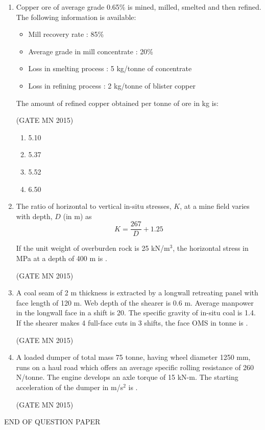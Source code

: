\documentclass[journal]{IEEEtran}
\begin{document}
\begin{enumerate}
\item Copper ore of average grade 0.65\% is mined, milled, smelted and then refined. The following information is available:

\begin{itemize}
\item Mill recovery rate : 85\%
\item Average grade in mill concentrate : 20\%
\item Loss in smelting process : 5 kg/tonne of concentrate
\item Loss in refining process : 2 kg/tonne of blister copper
\end{itemize}

The amount of refined copper obtained per tonne of ore in kg is:

\hfill(GATE MN 2015)

\begin{multicols}{4}
\begin{enumerate}
\item 5.10
\item 5.37
\item 5.52
\item 6.50
\end{enumerate}
\end{multicols}


\item The ratio of horizontal to vertical in-situ stresses, \(K\), at a mine field varies with depth, \(D\) (in m) as
\[
K = \frac{267}{D} + 1.25
\]

If the unit weight of overburden rock is 25 kN/m$^3$, the horizontal stress in MPa at a depth of 400 m is \underline{\hspace{2cm}}.


\hfill(GATE MN 2015)

\item A coal seam of 2 m thickness is extracted by a longwall retreating panel with face length of 120 m. Web depth of the shearer is 0.6 m. Average manpower in the longwall face in a shift is 20. The specific gravity of in-situ coal is 1.4. If the shearer makes 4 full-face cuts in 3 shifts, the face OMS in tonne is \underline{\hspace{2cm}}.

	\hfill(GATE MN 2015)


\item A loaded dumper of total mass 75 tonne, having wheel diameter 1250 mm, runs on a haul road which offers an average specific rolling resistance of 260 N/tonne. The engine develops an axle torque of 15 kN-m. The starting acceleration of the dumper in m/s$^2$ is \underline{\hspace{2cm}}.

	\hfill(GATE MN 2015)


\end{enumerate}
\begin{center}                                  
\huge{END OF QUESTION PAPER}               
\end{center}
\end{document}
